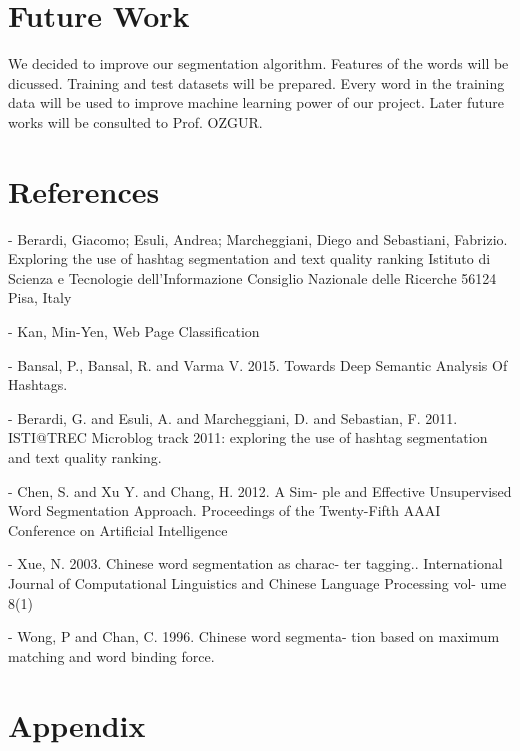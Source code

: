 \documentclass[12pt]{comjnl}
\begin{document}
\section{Future Work}
We decided to improve our segmentation algorithm. Features of the words will be dicussed. Training and test
datasets will be prepared. Every word in the training data will be used to improve machine
learning power of our project. Later future works will be consulted to Prof. OZGUR.

\section{References}
- Berardi, Giacomo; Esuli, Andrea; Marcheggiani, Diego and Sebastiani, Fabrizio. Exploring the use of hashtag segmentation and text quality ranking 
Istituto di Scienza e Tecnologie dell’Informazione Consiglio Nazionale delle Ricerche 56124 Pisa, Italy

- Kan, Min-Yen, Web Page Classification

- Bansal, P., Bansal, R. and Varma V. 2015. Towards
Deep Semantic Analysis Of Hashtags.

- Berardi, G. and Esuli, A. and Marcheggiani, D. and
Sebastian, F. 2011. ISTI@TREC Microblog track
2011: exploring the use of hashtag segmentation
and text quality ranking.

- Chen, S. and Xu Y. and Chang, H. 2012. A Sim-
ple and Effective Unsupervised Word Segmentation
Approach. Proceedings of the Twenty-Fifth AAAI
Conference on Artificial Intelligence

- Xue, N. 2003. Chinese word segmentation as charac-
ter tagging.. International Journal of Computational
Linguistics and Chinese Language Processing vol-
ume 8(1)

- Wong, P and Chan, C. 1996. Chinese word segmenta-
tion based on maximum matching and word binding
force.
\nocite{*}




\section{Appendix}
\end{document}
